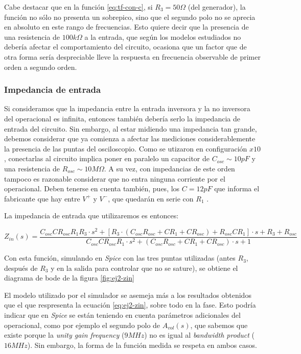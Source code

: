 \documentclass[../../main.tex]{subfiles}
\begin{document}
Cabe destacar que en la funci\'on \ref{eq:tf-con-c}, si $R_3=50\Omega$ (del generador), la funci\'on no s\'olo no presenta un sobrepico, sino que el segundo polo no se aprecia en absoluto en este rango de frecuencias. Esto quiere decir que la presencia de una resistencia de $100k\Omega$ a la entrada, que seg\'un los modelos estudiados no deber\'ia afectar el comportamiento del circuito, ocasiona que un factor que de otra forma ser\'ia despreciable lleve la respuesta en frecuencia observable de primer orden a segundo orden.

\subsubsection{Impedancia de entrada}
Si consideramos que la impedancia entre la entrada inversora y la no inversora del operacional es infinita, entonces tambi\'en deber\'ia serlo la impedancia de entrada del circuito. Sin embargo, al estar midiendo una impedancia tan grande, debemos considerar que ya comienza a afectar las mediciones considerablemente la presencia de las puntas del osciloscopio. Como se utizaron en configuraci\'on $x10$, conectarlas al circuito implica poner en paralelo un capacitor de $C_{osc}\sim10pF$ y una resistencia de $R_{osc}\sim10M\Omega$. A su vez, con impedancias de este orden tampoco es razonable considerar que no entra ninguna corriente por el operacional. Deben tenerse en cuenta tambi\'en, pues, los $C=12pF$ que informa el fabricante que hay entre $V^+$ y $V^-$, que quedar\'an en serie con $R_1$ .

La impedancia de entrada que utilizaremos es entonces:

\begin{equation} \label{eq:ej2-zin}
	Z_{in}(s) = \frac{ C_{osc} C R_{osc} R_1 R_3 \cdot s^2 + [ R_3 \cdot (C_{osc} R_{osc} + C R_1 + C R_{osc})  + R_{osc} C R_1] \cdot s + R_3 + R_{osc} }
						{ C_{osc} C R_{osc} R_1 \cdot s^2 + (C_{osc} R_{osc} + C R_1 + C R_{osc}) \cdot s + 1}
\end{equation}

Con esta funci\'on, simulando en \textit{Spice} con las tres puntas utilizadas (antes $R_3$, despu\'es de $R_3$ y en la salida para controlar que no se sature), se obtiene el diagrama de bode de la figura \ref{fig:ej2-zin}

El modelo utilizado por el simulador se asemeja m\'as a los resultados obtenidos que el que respresenta la ecuaci\'on \ref{eq:ej2-zin}, sobre todo en la fase. Esto podr\'ia indicar que en \textit{Spice} se est\'an teniendo en cuenta par\'ametros adicionales del operacional, como por ejemplo el segundo polo de $A_{vol}(s)$, que sabemos que existe porque la \textit{unity gain frequency} ($9MHz$) no es igual al \textit{bandwidth product} ($16MHz$). Sin embargo, la forma de la funci\'on medida se respeta en ambos casos.\par
\end{document}
